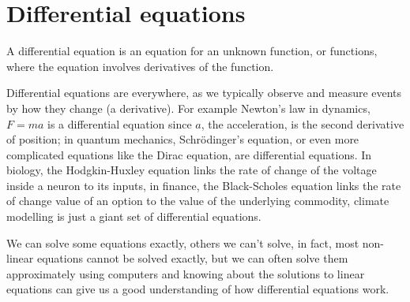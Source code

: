 \documentclass[12pt]{article}
\begin{document}
\section*{Differential equations}
A differential equation is an equation for an unknown function, or
functions, where the equation involves derivatives of the function. 

Differential equations are everywhere, as we typically observe and measure events by how they change (a derivative). For example Newton's law in dynamics, $F=ma$ is a
differential equation since $a$, the acceleration, is the second
derivative of position; in quantum mechanics, Schr\"{o}dinger's
equation, or even more complicated equations like the Dirac equation,
are differential equations. In biology, the Hodgkin-Huxley equation
links the rate of change of the voltage inside a neuron to its inputs,
in finance, the Black-Scholes equation links the rate of change value
of an option to the value of the underlying commodity, climate
modelling is just a giant set of differential equations.

We can solve some equations exactly, others we can't solve, in fact,
most non-linear equations cannot be solved exactly, but we can often
solve them approximately using computers and knowing about the
solutions to linear equations can give us a good understanding of how
differential equations work.
\end{document}
